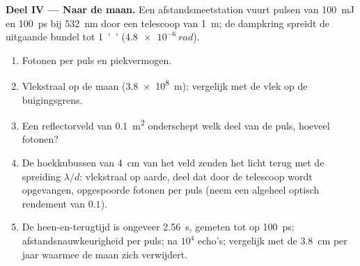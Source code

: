 \begin{problem}
\textbf{Deel IV --- Naar de maan.}
Een afstandsmeetstation vuurt pulsen van \qty{100}{mJ} en \qty{100}{ps} bij
\qty{532}{nm} door een telescoop van \qty{1}{m}; de dampkring spreidt
de uitgaande bundel tot \qty{1}{''} ($\qty{4.8e-6}{rad}$).
\begin{enumerate}[resume]
  \item Fotonen per puls en piekvermogen.
  \item Vlekstraal op de maan (\qty{3.8e8}{m}); vergelijk met de
        vlek op de buigingsgrens.
  \item Een reflectorveld van \qty{0.1}{m^2} onderschept welk deel van
        de puls, hoeveel fotonen?
  \item De hoekkubussen van \qty{4}{cm} van het veld zenden het licht terug met de
        spreiding $\lambda/d$: vlekstraal op aarde, deel dat door de
        telescoop wordt opgevangen, opgespoorde fotonen per puls (neem een
        algeheel optisch
        rendement van $0.1$).
  \item De heen-en-terugtijd is ongeveer \qty{2.56}{s}, gemeten tot op
        \qty{100}{ps}: afstandsnauwkeurigheid per puls; na $10^4$
        echo's; vergelijk met de \qty{3.8}{cm} per jaar waarmee de
        maan zich verwijdert.
\end{enumerate}
\end{problem}
